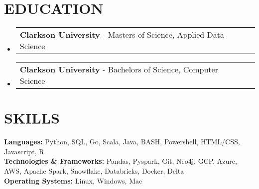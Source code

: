 \documentclass[letterpaper,11pt]{article}
\makeatletter
\newcommand{\educationSubheading}[3]{
  \vspace{-2pt}\item
    \begin{tabular*}{0.98\textwidth}[t]{l@{\extracolsep{\fill}}r}
      \textbf{\small#1} - {\small#2} & \textbf{\textit{\small#3}} \\
    \end{tabular*}\vspace{-7pt}
}
\makeatother
\begin{document}
\section{\textbf{EDUCATION}} 
    \begin{itemize}[leftmargin=0.05in, label={}]
        \educationSubheading{Clarkson University}{Masters of Science, Applied Data Science}{}
        \educationSubheading{Clarkson University}{Bachelors of Science, Computer Science}{}
    \end{itemize}


\section{\textbf{SKILLS}}
    \begin{itemize}[leftmargin=0.05in, label={}]
        \small{\item{
        \textbf{Languages: }{Python, SQL, Go, Scala, Java, BASH, Powershell, HTML/CSS, Javascript, R} \\
        \textbf{Technologies \& Frameworks: }{Pandas, Pyspark, Git, Neo4j, GCP, Azure, AWS, Apache Spark, Snowflake, Databricks, Docker, Delta} \\
        \textbf{Operating Systems: }{Linux, Windows, Mac } \\
        }}
    \end{itemize}


\end{document}
